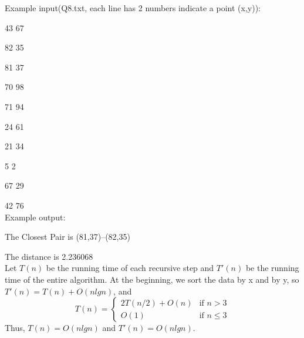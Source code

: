 \documentclass[a4paper,12pt]{article}
\begin{document}
Example input(Q8.txt, each line has 2 numbers indicate a point (x,y)):

43 67

82 35

81 37

70 98

71 94

24 61

21 34

5 2

67 29

42 76
\\

Example output:

The Closest Pair is (81,37)--(82,35)

The distance is 2.236068
\\

Let $T(n)$ be the running time of each recursive step and $T'(n)$ be the running time of the entire algorithm. At the beginning, we sort the data by x and by y, so $T'(n)=T(n)+O(nlgn)$, and
\[
T(n)=
\begin{cases}
2T(n/2)+O(n) & \text{if $n>3$}\\
O(1) & \text{if $n\leq 3$}
\end{cases}
\]
Thus, $T(n)=O(nlgn)$ and $T'(n)=O(nlgn)$.
\end{document}
